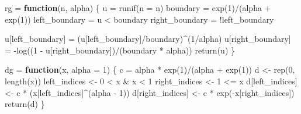 \documentclass[
]{article}
\newenvironment{Shaded}{\begin{snugshade}}{\end{snugshade}}
\newcommand{\AttributeTok}[1]{\textcolor[rgb]{0.77,0.63,0.00}{#1}}
\newcommand{\ControlFlowTok}[1]{\textcolor[rgb]{0.13,0.29,0.53}{\textbf{#1}}}
\newcommand{\DecValTok}[1]{\textcolor[rgb]{0.00,0.00,0.81}{#1}}
\newcommand{\FunctionTok}[1]{\textcolor[rgb]{0.00,0.00,0.00}{#1}}
\newcommand{\NormalTok}[1]{#1}
\newcommand{\OtherTok}[1]{\textcolor[rgb]{0.56,0.35,0.01}{#1}}
\newcommand{\SpecialCharTok}[1]{\textcolor[rgb]{0.00,0.00,0.00}{#1}}
\begin{document}
\begin{Shaded}
\begin{Highlighting}[]
\NormalTok{rg }\OtherTok{=} \ControlFlowTok{function}\NormalTok{(n, alpha) \{}
\NormalTok{    u }\OtherTok{=} \FunctionTok{runif}\NormalTok{(}\AttributeTok{n =}\NormalTok{ n)}
\NormalTok{    boundary }\OtherTok{=} \FunctionTok{exp}\NormalTok{(}\DecValTok{1}\NormalTok{)}\SpecialCharTok{/}\NormalTok{(alpha }\SpecialCharTok{+} \FunctionTok{exp}\NormalTok{(}\DecValTok{1}\NormalTok{))}
\NormalTok{    left\_boundary }\OtherTok{=}\NormalTok{ u }\SpecialCharTok{\textless{}}\NormalTok{ boundary}
\NormalTok{    right\_boundary }\OtherTok{=} \SpecialCharTok{!}\NormalTok{left\_boundary}
    
\NormalTok{    u[left\_boundary] }\OtherTok{=}\NormalTok{ (u[left\_boundary]}\SpecialCharTok{/}\NormalTok{boundary)}\SpecialCharTok{\^{}}\NormalTok{(}\DecValTok{1}\SpecialCharTok{/}\NormalTok{alpha)}
\NormalTok{    u[right\_boundary] }\OtherTok{=} \SpecialCharTok{{-}}\FunctionTok{log}\NormalTok{((}\DecValTok{1} \SpecialCharTok{{-}}\NormalTok{ u[right\_boundary])}\SpecialCharTok{/}\NormalTok{(boundary }\SpecialCharTok{*}\NormalTok{ alpha))}
    \FunctionTok{return}\NormalTok{(u)}
\NormalTok{\}}

\NormalTok{dg }\OtherTok{=} \ControlFlowTok{function}\NormalTok{(x, }\AttributeTok{alpha =} \DecValTok{1}\NormalTok{) \{}
\NormalTok{    c }\OtherTok{=}\NormalTok{ alpha }\SpecialCharTok{*} \FunctionTok{exp}\NormalTok{(}\DecValTok{1}\NormalTok{)}\SpecialCharTok{/}\NormalTok{(alpha }\SpecialCharTok{+} \FunctionTok{exp}\NormalTok{(}\DecValTok{1}\NormalTok{))}
\NormalTok{    d }\OtherTok{\textless{}{-}} \FunctionTok{rep}\NormalTok{(}\DecValTok{0}\NormalTok{, }\FunctionTok{length}\NormalTok{(x))}
\NormalTok{    left\_indices }\OtherTok{\textless{}{-}} \DecValTok{0} \SpecialCharTok{\textless{}}\NormalTok{ x }\SpecialCharTok{\&}\NormalTok{ x }\SpecialCharTok{\textless{}} \DecValTok{1}
\NormalTok{    right\_indices }\OtherTok{\textless{}{-}} \DecValTok{1} \SpecialCharTok{\textless{}=}\NormalTok{ x}
\NormalTok{    d[left\_indices] }\OtherTok{\textless{}{-}}\NormalTok{ c }\SpecialCharTok{*}\NormalTok{ (x[left\_indices]}\SpecialCharTok{\^{}}\NormalTok{(alpha }\SpecialCharTok{{-}} \DecValTok{1}\NormalTok{))}
\NormalTok{    d[right\_indices] }\OtherTok{\textless{}{-}}\NormalTok{ c }\SpecialCharTok{*} \FunctionTok{exp}\NormalTok{(}\SpecialCharTok{{-}}\NormalTok{x[right\_indices])}
    \FunctionTok{return}\NormalTok{(d)}
\NormalTok{\}}
\end{Highlighting}
\end{Shaded}
\end{document}
